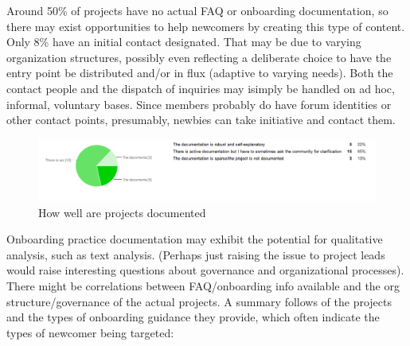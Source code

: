 Around 50\% of projects have no actual FAQ or onboarding documentation, so there may exist opportunities to help newcomers by creating this type of content. Only 8\% have an initial contact designated. That may be due to varying organization structures, possibly even reflecting a deliberate choice to have the entry point be distributed and/or in flux (adaptive to varying needs). Both the contact people and the dispatch of inquiries may isimply be handled on ad hoc, informal, voluntary bases. Since members probably do have forum identities or other contact points, presumably, newbies can take initiative and contact them.

\begin{figure}[ht!]
\centering
\includegraphics[width=120mm]{chapters/img/documentation.png}
\caption{How well are projects documented }
\label{overflow}
\end{figure}

Onboarding practice documentation may exhibit the potential for qualitative analysis, such as text analysis. (Perhaps just raising the issue  to project leads would raise interesting questions about governance and organizational processes). There might be correlations between FAQ/onboarding info available and the org structure/governance of the actual projects. A summary follows of the projects and the types of onboarding guidance they provide, which often indicate the types of newcomer being targeted:

